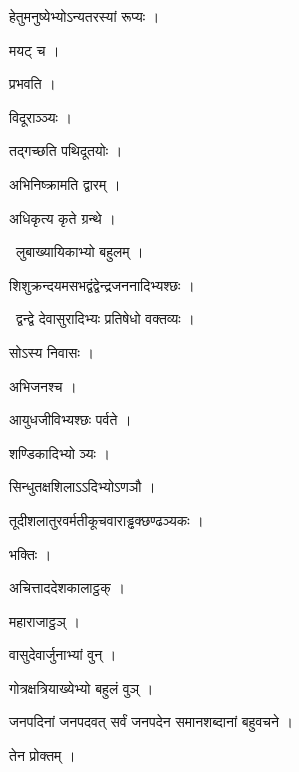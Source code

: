 \documentclass[10pt, openany, oneside]{book}
\begin{document}
\noindent हेतुमनुष्येभ्योऽन्यतरस्यां रूप्यः ।

\noindent मयट् च ।

\noindent प्रभवति ।

\noindent विदूराञ्ञ्यः ।

\noindent तद्गच्छति पथिदूतयोः ।

\noindent अभिनिष्क्रामति द्वारम् ।

\noindent अधिकृत्य कृते ग्रन्थे ।

\par\noindent\hspace{1.5em}{\vps वा॰}~{\qt लुबाख्यायिकाभ्यो बहुलम् ।}

\noindent शिशुक्रन्दयमसभद्वंद्वेन्द्रजननादिभ्यश्छः ।

\par\noindent\hspace{1.5em}{\vps वा॰}~{\qt द्वन्द्वे देवासुरादिभ्यः प्रतिषेधो वक्तव्यः ।}

\noindent सोऽस्य निवासः ।

\noindent अभिजनश्च ।

\noindent आयुधजीविभ्यश्छः पर्वते ।

\noindent शण्डिकादिभ्यो ञ्यः ।

\noindent सिन्धुतक्षशिलाऽऽदिभ्योऽणञौ ।

\noindent तूदीशलातुरवर्मतीकूचवाराड्ढक्छण्ढञ्यकः ।

\noindent भक्तिः ।

\noindent अचित्ताददेशकालाट्ठक् ।

\noindent महाराजाट्ठञ् ।

\noindent वासुदेवार्जुनाभ्यां वुन् ।

\noindent गोत्रक्षत्रियाख्येभ्यो बहुलं वुञ् ।

\noindent जनपदिनां जनपदवत् सर्वं जनपदेन समानशब्दानां बहुवचने ।

\noindent तेन प्रोक्तम् ।
\end{document}
